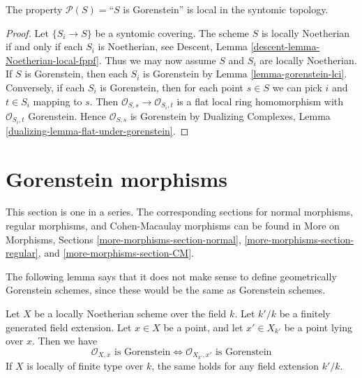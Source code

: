 \begin{lemma}
\label{lemma-gorenstein-local-syntomic}
The property $\mathcal{P}(S) =$``$S$ is Gorenstein''
is local in the syntomic topology.
\end{lemma}

\begin{proof}
Let $\{S_i \to S\}$ be a syntomic covering. The scheme $S$ is locally
Noetherian if and only if each $S_i$ is Noetherian, see
Descent, Lemma \ref{descent-lemma-Noetherian-local-fppf}.
Thus we may now assume $S$ and $S_i$ are locally Noetherian.
If $S$ is Gorenstein, then
each $S_i$ is Gorenstein by Lemma \ref{lemma-gorenstein-lci}.
Conversely, if each $S_i$ is Gorenstein, then for each point
$s \in S$ we can pick $i$ and $t \in S_i$ mapping to $s$.
Then $\mathcal{O}_{S, s} \to \mathcal{O}_{S_i, t}$
is a flat local ring homomorphism with $\mathcal{O}_{S_i, t}$
Gorenstein. Hence $\mathcal{O}_{S, s}$ is Gorenstein by
Dualizing Complexes, Lemma \ref{dualizing-lemma-flat-under-gorenstein}.
\end{proof}






\section{Gorenstein morphisms}
\label{section-gorenstein-morphisms}

\noindent
This section is one in a series. The corresponding sections for
normal morphisms,
regular morphisms, and
Cohen-Macaulay morphisms
can be found in More on Morphisms, Sections
\ref{more-morphisms-section-normal},
\ref{more-morphisms-section-regular}, and
\ref{more-morphisms-section-CM}.

\medskip\noindent
The following lemma says that it does not make sense to define
geometrically Gorenstein schemes, since these would be the
same as Gorenstein schemes.

\begin{lemma}
\label{lemma-gorenstein-base-change}
Let $X$ be a locally Noetherian scheme over the field $k$.
Let $k'/k$ be a finitely generated field extension.
Let $x \in X$ be a point, and let $x' \in X_{k'}$ be a point lying
over $x$. Then we have
$$
\mathcal{O}_{X, x}\text{ is Gorenstein}
\Leftrightarrow
\mathcal{O}_{X_{k'}, x'}\text{ is Gorenstein}
$$
If $X$ is locally of finite type over $k$, the same holds for any
field extension $k'/k$.
\end{lemma}

